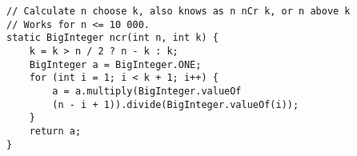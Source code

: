 \begin{verbatim}
// Calculate n choose k, also knows as n nCr k, or n above k
// Works for n <= 10 000.
static BigInteger ncr(int n, int k) {
	k = k > n / 2 ? n - k : k;
	BigInteger a = BigInteger.ONE;
	for (int i = 1; i < k + 1; i++) {
		a = a.multiply(BigInteger.valueOf
		(n - i + 1)).divide(BigInteger.valueOf(i));
	}
	return a;
}
\end{verbatim}